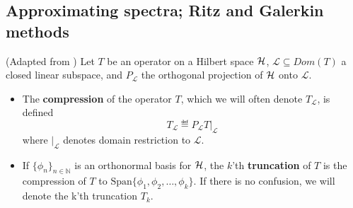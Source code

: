 \documentclass[../main.tex]{subfiles}
\begin{document}
\subsection{Approximating spectra; Ritz and Galerkin methods}

\begin{definition}
(Adapted from \parencite{davies1995spectral})
  Let $T$ be an operator on a Hilbert space $\mathcal{H}$, $\mathcal{L} \subseteq
  Dom(T)$ a closed linear subspace, and $P_\mathcal{L}$ the orthogonal
  projection of $\mathcal{H}$ onto $\mathcal{L}$.
  \begin{itemize}
  \item The \textbf{compression} of the operator $T$, which we will often denote
    $T_\mathcal{L}$, is defined 
      $$T_\mathcal{L} \eqdef P_\mathcal{L} T\big|_{\mathcal{L}}$$
    where $\big|_{\mathcal{L}}$ denotes domain restriction to $\mathcal{L}$. 
  \item If $\{\phi_n\}_{n \in \mathbb{N}}$ is an orthonormal basis
    for $\mathcal{H}$, the $k$'th \textbf{truncation} of $T$ is the compression
    of $T$ to $\text{Span}\{\phi_1, \phi_2, \hdots, \phi_k\}$. If
    there is no confusion, we will denote the k'th truncation $T_k$.
  \end{itemize}
\end{definition}
\end{document}
